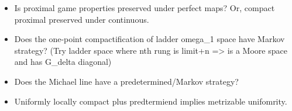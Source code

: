 \begin{itemize}
\begin{itemize}
        \item Is proximal game properties preserved under perfect maps? Or, compact proximal preserved under continuous.
        \item Does the one-point compactification of ladder omega_1 space have Markov strategy? (Try ladder space where
              nth rung is limit+n => is a Moore space and has G_delta diagonal)
        \item Does the Michael line have a predetermined/Markov strategy?
        \item Uniformly locally compact plus predtermiend implies metrizable unifomrity.
      \end{itemize}
  \end{itemize}

